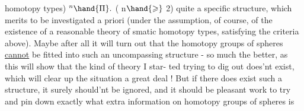 homotopy types) ${}^n\hand{\Pi}.$ ( n$\hand{\geqslant}$ 2) quite a specific structure, which merits
to be investigated a priori (under the assumption, of course, of the
existence of a reasonable theory of smatic homotopy types, satisfying
the criteria above). Maybe after all it will\hand{\unsure{,}} turn out that the homotopy
groups of spheres \uline{cannot} be fitted into such an uncompassing structure
- so much the better, as this will show that the kind of theory I star-%
ted trying to dig out does'nt exist, which will clear up the situation
a great deal ! But if there does exist such a  structure, it surely
should'nt be ignored, and it should be pleasant work to try and pin
down exactly what extra information on homotopy groups of spheres is

